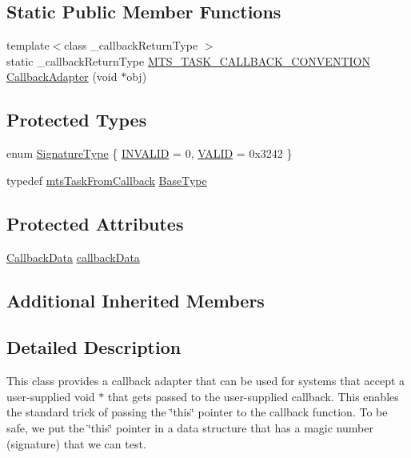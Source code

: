 \subsection*{Static Public Member Functions}
\begin{DoxyCompactItemize}
\item 
{\footnotesize template$<$class \+\_\+callback\+Return\+Type $>$ }\\static \+\_\+callback\+Return\+Type \hyperlink{mts_task_from_callback_8h_a7501f94bb1b37dc8d295bd2f2c800084}{M\+T\+S\+\_\+\+T\+A\+S\+K\+\_\+\+C\+A\+L\+L\+B\+A\+C\+K\+\_\+\+C\+O\+N\+V\+E\+N\+T\+I\+O\+N} \hyperlink{classmts_task_from_callback_adapter_aabe621b924092e85d4729bda7cbfce06}{Callback\+Adapter} (void $\ast$obj)
\end{DoxyCompactItemize}
\subsection*{Protected Types}
\begin{DoxyCompactItemize}
\item 
enum \hyperlink{classmts_task_from_callback_adapter_aa81f29d07e560c1b9f5a9f004e49df97}{Signature\+Type} \{ \hyperlink{classmts_task_from_callback_adapter_aa81f29d07e560c1b9f5a9f004e49df97a7c9a9db9f50a953eb0a559f305bf6f80}{I\+N\+V\+A\+L\+I\+D} = 0, 
\hyperlink{classmts_task_from_callback_adapter_aa81f29d07e560c1b9f5a9f004e49df97aed556e2efeed6c0fb3d38d53fefb5d08}{V\+A\+L\+I\+D} = 0x3242
 \}
\item 
typedef \hyperlink{classmts_task_from_callback}{mts\+Task\+From\+Callback} \hyperlink{classmts_task_from_callback_adapter_a1f50853b13e0014ad9c64ac6b11f3216}{Base\+Type}
\end{DoxyCompactItemize}
\subsection*{Protected Attributes}
\begin{DoxyCompactItemize}
\item 
\hyperlink{structmts_task_from_callback_adapter_1_1_callback_data}{Callback\+Data} \hyperlink{classmts_task_from_callback_adapter_aa7f1cc998e5366d8c3eebc802f9d7652}{callback\+Data}
\end{DoxyCompactItemize}
\subsection*{Additional Inherited Members}


\subsection{Detailed Description}
This class provides a callback adapter that can be used for systems that accept a user-\/supplied \textquotesingle{}void $\ast$\textquotesingle{} that gets passed to the user-\/supplied callback. This enables the standard trick of passing the \char`\"{}this\char`\"{} pointer to the callback function. To be safe, we put the \char`\"{}this\char`\"{} pointer in a data structure that has a magic number (signature) that we can test. 

